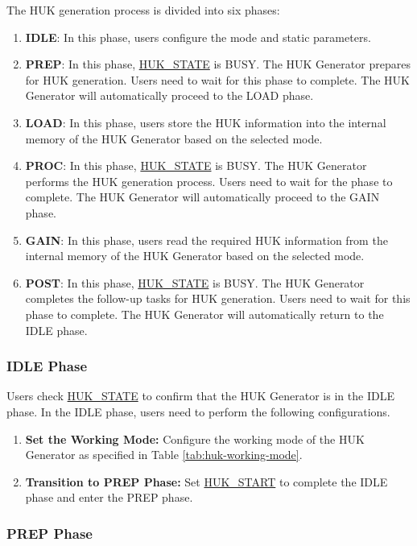 \documentclass[main\_\_EN.tex]{subfiles}
\begin{document}
The HUK generation process is divided into six phases:
\begin{enumerate}
    \item \textbf{IDLE}: In this phase, users configure the mode and static parameters.
    \item \textbf{PREP}: In this phase, \hyperref[fielddesc:HUKSTATE]{HUK\_STATE} is BUSY. The HUK Generator prepares for HUK generation. Users need to wait for this phase to complete. The HUK Generator will automatically proceed to the LOAD phase.
    \item \textbf{LOAD}: In this phase, users store the HUK information into the internal memory of the HUK Generator based on the selected mode.
    \item \textbf{PROC}: In this phase, \hyperref[fielddesc:HUKSTATE]{HUK\_STATE} is BUSY. The HUK Generator performs the HUK generation process. Users need to wait for the phase to complete. The HUK Generator will automatically proceed to the GAIN phase.
    \item \textbf{GAIN}: In this phase, users read the required HUK information from the internal memory of the HUK Generator based on the selected mode.
    \item \textbf{POST}: In this phase, \hyperref[fielddesc:HUKSTATE]{HUK\_STATE} is BUSY. The HUK Generator completes the follow-up tasks for HUK generation. Users need to wait for this phase to complete. The HUK Generator will automatically return to the IDLE phase.
\end{enumerate}

\subsubsection{IDLE Phase}

Users check \hyperref[fielddesc:HUKSTATE]{HUK\_STATE} to confirm that the HUK Generator is in the IDLE phase. In the IDLE phase, users need to perform the following configurations.
\begin{enumerate}
    \item \textbf{Set the Working Mode:} Configure the working mode of the HUK Generator as specified in Table \ref{tab:huk-working-mode}.
    \item \textbf{Transition to PREP Phase:} Set \hyperref[fielddesc:HUKSTART]{HUK\_START} to complete the IDLE phase and enter the PREP phase.
\end{enumerate}

\subsubsection{PREP Phase}
\end{document}
